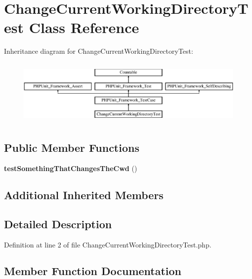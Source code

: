 \section{Change\+Current\+Working\+Directory\+Test Class Reference}
\label{class_change_current_working_directory_test}
Inheritance diagram for Change\+Current\+Working\+Directory\+Test\+:\begin{figure}[H]
\begin{center}
\leavevmode
\includegraphics[height=3.260553cm]{class_change_current_working_directory_test}
\end{center}
\end{figure}
\subsection*{Public Member Functions}
\begin{DoxyCompactItemize}
\item 
{\bf test\+Something\+That\+Changes\+The\+Cwd} ()
\end{DoxyCompactItemize}
\subsection*{Additional Inherited Members}


\subsection{Detailed Description}


Definition at line 2 of file Change\+Current\+Working\+Directory\+Test.\+php.



\subsection{Member Function Documentation}
